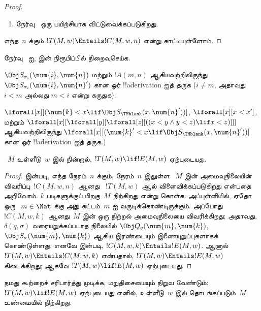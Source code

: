 \documentclass[../../../include/open-logic-section]{subfiles}
\begin{document}
\begin{proof}
\begin{enumerate}
\item நேர்வு~ ஒரு பயிற்சியாக விட்டுவைக்கப்படுகிறது.
\end{enumerate}
எந்த~$n$ க்கும் $!T(M, w) \Entails !C(M, w, n)$ என்று காட்டியுள்ளோம்.
\end{proof}

\begin{prob}
நேர்வு~ ஐ,
 இன் நிரூபிப்பில் நிறைவுசெய்க.
\end{prob}

\begin{prob}
$\Obj S_{\sigma_i}(\num{i}, \num{n})$ மற்றும் $!A(m, n)$ ஆகியவற்றிலிருந்து
$\Obj S_{\sigma_i}(\num{i}, \num{n}')$ கான ஓர் !!a{derivation} ஐத்
தருக ($i \neq m$, அதாவது $i < m$ அல்லது $m < i$ என்று கருதுக).
\end{prob}

\begin{prob}
$\lforall[x][(\num{k} < x \lif \Obj
  S_\TMblank(x, \num{n}'))]$, $\lforall[x][x < x']$, மற்றும்
$\lforall[x][\lforall[y][\lforall[z][ ((x < y \land y < z) \lif x <
      z)]]]$ ஆகியவற்றிலிருந்து
$\lforall[x][(\num{k}' < x \lif \Obj
  S_\TMblank(x, \num{n}'))]$ கான ஓர் !!a{derivation} ஐத் தருக.)
\end{prob}


\begin{lem}
~$M$ உள்ளீடு~$w$ இல் நின்றால், $!T(M, w) \lif
!E(M, w)$ ஏற்புடையது.
\end{lem}

\begin{proof}
 இன்படி, எந்த நேரம்~$n$ க்கும், நேரம்~$n$ இலுள்ள
~$M$ இன் அமைவுநிலையின் விவரிப்பு~$!C(M, w, n)$ ஆனது
~$!T(M, w)$ ஆல் விளைவிக்கப்படுகிறது என்பதை அறிவோம். $k$ படிகளுக்குப்
பிறகு~$M$ நிற்கிறது என்று கொள்க. அப்புள்ளியில், ஏதோ ஒரு
~$m \in \Nat$ க்கு அது கட்டம்~$m$ ஐ வருடிக்கொண்டிருக்கும். அப்போது
$!C(M, w, k)$ ஆனது~$M$ இன் ஒரு நிற்றல் அமைவுநிலையை விவரிக்கிறது;
அதாவது, $\delta(q,\sigma)$ வரையறுக்கப்படாத நிலையில்
$\Obj Q_q(\num{m}, \num{k})$, $\Obj
S_\sigma(\num{m}, \num{k})$ ஆகிய இரண்டையும் இணையுறுப்புகளாகக்
கொண்டுள்ளது. எனவே  இன்படி,
$!C(M, w, k) \Entails !E(M, w)$. ஆனால்
$!T(M, w) \Entails !C(M, w, k)$ என்பதால்,
$!T(M, w) \Entails !E(M, w)$ கிடைக்கிறது; ஆகவே
$!T(M, w) \lif !E(M, w)$ ஏற்புடையது.
\end{proof}


\begin{explain} 
நமது கூற்றைச் சரிபார்த்து முடிக்க, மறுதிசையையும் நிறுவ வேண்டும்:
$!T(M, w) \lif !E(M, w)$ ஏற்புடையது எனில், உள்ளீடு~$w$ இல்
தொடங்கப்படும்~$M$ உண்மையில் நிற்கிறது.
\end{explain}
\end{document}
